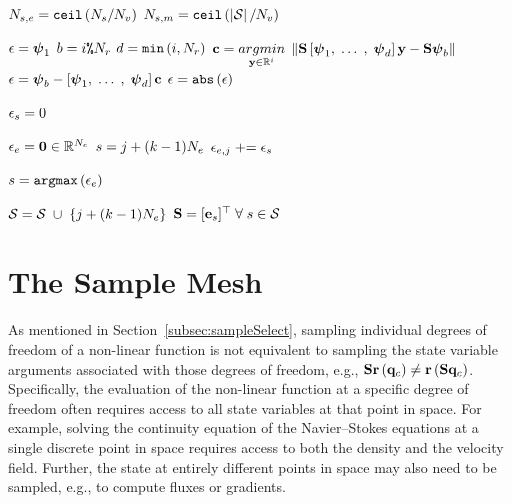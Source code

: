 \begin{enumerate}
\begin{algorithm}
\begin{algorithmic}
			\STATE $N_{s,e} = \mathtt{ceil}\left(N_s / N_{v} \right)$
			\STATE $N_{s,m} = \mathtt{ceil} \left( \left\vert \mathcal{S} \right\vert / N_{v} \right)$
			
	
					\STATE $\epsilon = \boldsymbol{\psi}_1$
				\ELSE
					\STATE $b = i \text{\texttt{\%}} N_r$
					\STATE $d = \mathtt{min}\left(i, N_r \right)$
					\STATE $\mathbf{c} = \underset{\mathbf{y} \in \mathbb{R}^{i}}{argmin} \; \left\lVert\mathbf{S} \left[\boldsymbol{\psi}_1, \; \hdots \;, \; \boldsymbol{\psi}_{d} \right] \mathbf{y} - \mathbf{S} \boldsymbol{\psi}_{b}\right\rVert$
					\STATE $\epsilon = \boldsymbol{\psi}_{b} - \left[\boldsymbol{\psi}_1, \; \hdots \;, \; \boldsymbol{\psi}_{d} \right] \mathbf{c}$
				\ENDIF
				\STATE $\epsilon = \mathtt{abs}\left(\epsilon\right)$
				
				\FORALL{$\sampIdx \in \sampSet$}
					\STATE $\epsilon_{s} = 0$ 
				\ENDFOR
	
				\STATE $\epsilon_{e} = \mathbf{0} \in \mathbb{R}^{N_{e}}$
						\STATE $s = j + (k - 1) N_{e}$
						\STATE $\epsilon_{e,j} \mathrel{+}= \epsilon_{s}$ 
					\ENDFOR
				\ENDFOR
				
				\STATE $s = \mathtt{argmax} \left( \epsilon_{e} \right)$
	
					\STATE $\mathcal{S} = \mathcal{S} \; \cup \; \{j + (k - 1) N_{e}\} $ 
				\ENDFOR
				\STATE $\mathbf{S} = [\mathbf{e}_{s}]^\top \; \forall \; s \in \mathcal{S}$
				
			\ENDFOR
		\end{algorithmic}
	\end{algorithm}

\end{enumerate}

\section{The Sample Mesh}\label{sec:sampleMesh}

As mentioned in Section~\ref{subsec:sampleSelect}, sampling individual degrees of freedom of a non-linear function is not equivalent to sampling the state variable arguments associated with those degrees of freedom, e.g., $\mathbf{S} \mathbf{r}\left(\mathbf{q}_{c}\right) \neq \mathbf{r}\left(\mathbf{S} \mathbf{q}_{c}\right)$. Specifically, the evaluation of the non-linear function at a specific degree of freedom often requires access to all state variables at that point in space. For example, solving the continuity equation of the Navier--Stokes equations at a single discrete point in space requires access to both the density and the velocity field. Further, the state at entirely different points in space may also need to be sampled, e.g., to compute fluxes or gradients.

